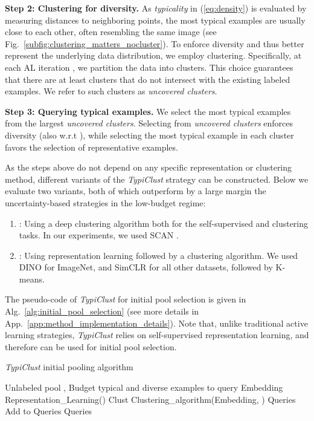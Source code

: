 \documentclass{article}
\newcommand{\myparagraph}[1]{\smallskip\noindent\textbf{#1}}
\newcommand{\app}{App.}
\begin{document}
\myparagraph{Step 2: Clustering for diversity.}
As \emph{typicality} in (\ref{eq:density}) is evaluated by measuring distances to neighboring points, the most typical examples are usually close to each other, often resembling the same image (see Fig.~\ref{subfig:clustering_matters_nocluster}). To enforce diversity and thus better represent the underlying data distribution, we employ clustering. Specifically, at each AL iteration , we partition the data into  clusters. This choice guarantees that there are at least  clusters that do not intersect with the existing labeled examples. We refer to such clusters as \emph{uncovered clusters}.

\myparagraph{Step 3: Querying typical examples.}
We select the most typical examples from the  largest \emph{uncovered clusters}. Selecting from \emph{uncovered clusters} enforces diversity (also w.r.t ), while selecting the most typical example in each cluster favors the selection of representative examples.

As the steps above do not depend on any specific representation or clustering method, different variants of the \emph{TypiClust} strategy can be constructed. Below we evaluate two variants, both of which outperform by a large margin the uncertainty-based strategies in the low-budget regime:
\begin{enumerate}
    \item \textit{}: Using a deep clustering algorithm both for the self-supervised and clustering tasks. In our experiments, we used SCAN \citep{van2020scan}.
    \item \textit{}: Using representation learning followed by a clustering algorithm. We used DINO \citep{caron2021emerging} for ImageNet, and SimCLR \citep{chen2020simple} for all other datasets, followed by K-means.
\end{enumerate}
The pseudo-code of \emph{TypiClust} for initial pool selection is given in Alg.~\ref{alg:initial_pool_selection} (see more details in \app~\ref{app:method_implementation_details}). Note that, unlike traditional active learning strategies, \emph{TypiClust} relies on self-supervised representation learning, and therefore can be used for initial pool selection.

\begin{algorithm}[hbt!]
\begin{algorithmic}
\caption{\emph{TypiClust} initial pooling algorithm}
\label{alg:initial_pool_selection}
     Unlabeled pool , Budget 
      typical and diverse examples to query
    \STATE Embedding  Representation\_Learning()
    \STATE Clust  Clustering\_algorithm(Embedding,  )
    \STATE Queries \;
    \FORALL{}
\STATE Add  to Queries
    \ENDFOR
     Queries
\end{algorithmic}
\end{algorithm}
\end{document}
